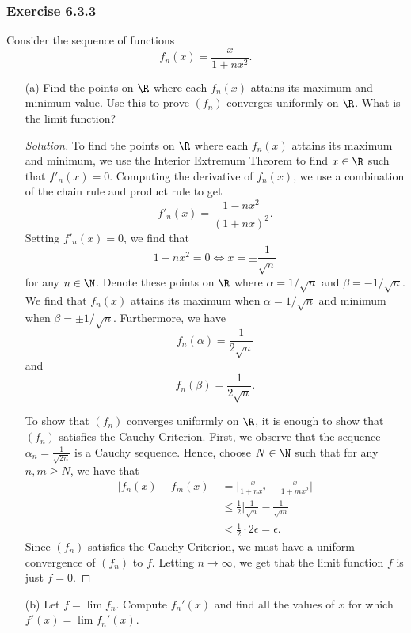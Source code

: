\subsubsection{Exercise 6.3.3} Consider the sequence of functions
\[  f_n(x) = \frac{ x }{ 1 + nx^2  }. \]
\begin{enumerate}
    \item[(a)] Find the points on \( \R  \) where each \( f_n(x)  \) attains its maximum and minimum value. Use this to prove \( (f_n)  \) converges uniformly on \( \R  \). What is the limit function? 
        \begin{proof}[Solution]
        To find the points on \( \R  \) where each \( f_n(x)  \) attains its maximum and minimum, we use the Interior Extremum Theorem to find \( x \in \R  \) such that \( f'_n(x) = 0   \). Computing the derivative of \( f_n(x)  \), we use a combination of the chain rule and product rule to get
        \[  f'_n(x) = \frac{ 1 - nx^2  }{ (1 +nx)^2 }.  \]
        Setting \( f'_n(x) = 0  \), we find that 
        \[  1 - nx^2 = 0 \iff x = \pm \frac{ 1 }{ \sqrt{ n }  }  \]
        for any \( n \in \N  \). Denote these points on \( \R  \) where \( \alpha = 1 / \sqrt{ n }  \) and \( \beta = -  1 / \sqrt{ n }  \). We find that \( f_n(x)  \) attains its maximum when \( \alpha = 1 / \sqrt{ n  }  \) and minimum when \( \beta = \pm 1 / \sqrt{ n }  \). Furthermore, we have 
        \[  f_n(\alpha) =  \frac{ 1 }{ 2 \sqrt{ n }  }    \]
        and 
        \[  f_n(\beta) = \frac{ 1 }{ 2 \sqrt{ n }  }.  \]

        To show that \( (f_n)  \) converges uniformly on \( \R  \), it is enough to show that \( (f_n)  \) satisfies the Cauchy Criterion. First, we observe that the sequence \( \alpha_n = \frac{ 1 }{ \sqrt{2n }  }  \) is a Cauchy sequence. Hence, choose \( N \in \N  \) such that for any \( n,m \geq N  \), we have that 
        \begin{align*}
            | f_n(x) - f_m(x)  | &= \Big| \frac{ x }{ 1 + nx^2  } - \frac{ x  }{  1 + mx^2  }  \Big|   \\
                                 &\leq \frac{ 1 }{ 2 } \Big|  \frac{ 1 }{ \sqrt{ n }  } - \frac{ 1 }{ \sqrt{ m }  }  \Big| \\
                                 &< \frac{ 1 }{ 2 } \cdot 2 \epsilon = \epsilon. 
        \end{align*}
        Since \( (f_n)  \) satisfies the Cauchy Criterion, we must have a uniform convergence of \( (f_n)  \) to \( f  \). Letting \(  n \to \infty   \), we get that the limit function \( f  \) is just \( f = 0  \).
        \end{proof}
    \item[(b)] Let \( f = \lim f_n  \). Compute \( f_n'(x)  \) and find all the values of \( x  \) for which \( f'(x) = \lim f_n'(x)  \).
\end{enumerate}







